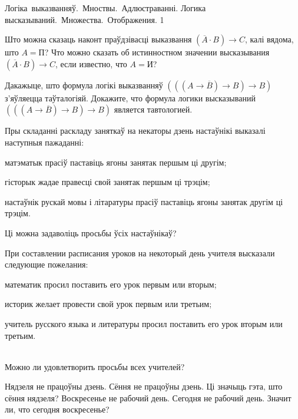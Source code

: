 



\quizTitle
{Логіка~выказванняў.~Мноствы.~Адлюстраванні.}
{Логика высказываний.~Множества.~Отображения.}
{1}

\begin{problemList}
	
\problemItemSimple
{Што можна сказаць наконт праўдзівасці выказвання $(\overline{A} \cdot B) \to C$, калі вядома, што $A = \mbox{П}$?}
{Что можно сказать об истинностном значении высказывания $(\overline{A} \cdot B) \to C$, если известно, что $A = \mbox{И}$?}

\bigskip

\problemItemSimple
{Дакажыце, што формула логікі выказванняў $(((A \to \overline{B}) \to B) \to B)$ з'яўляецца таўталогіяй.}
{Докажите, что формула логики высказываний $(((A \to \overline{B}) \to B) \to B)$ является тавтологией.}

\bigskip

\problemItemSimple
{Пры складанні раскладу заняткаў на некаторы дзень настаўнікі выказалі наступныя пажаданні:
\begin{belarusianEnumerate}
	\item матэматык прасіў паставіць ягоны занятак першым ці другім;
	\item гісторык жадае правесці свой занятак першым ці трэцім;
	\item настаўнік рускай мовы і літаратуры прасіў паставіць ягоны занятак другім ці трэцім.
\end{belarusianEnumerate}

Ці можна задаволіць просьбы ўсіх настаўнікаў?}
{При составлении расписания уроков на некоторый день учителя высказали следующие пожелания:
\begin{russianEnumerate}
	\item математик просил поставить его урок первым или вторым;
	\item историк желает провести свой урок первым или третьим;
	\item учитель русского языка и литературы просил поставить его урок вторым или третьим.
\end{russianEnumerate}\\
Можно ли удовлетворить просьбы всех учителей?}

\bigskip

\problemItemSimple
{Нядзеля не працоўны дзень. Сёння не працоўны дзень. Ці значыць гэта, што сёння нядзеля?}
{Воскресенье не рабочий день. Сегодня не рабочий день. Значит ли, что сегодня воскресенье?}


\end{problemList}
